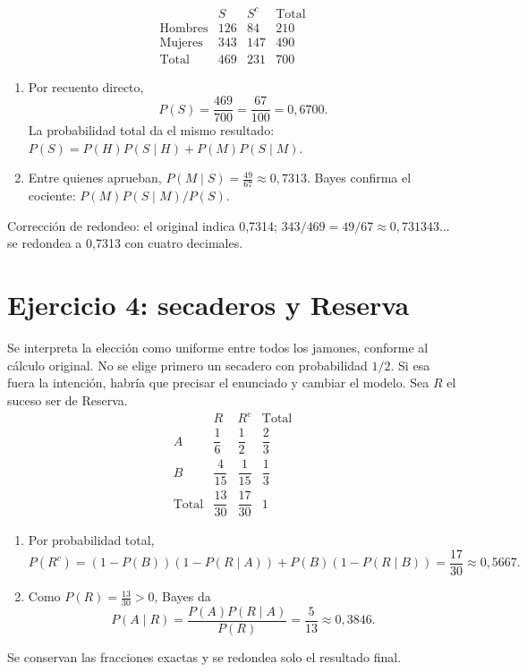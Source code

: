 \documentclass[11pt]{article}
\begin{document}
\[\begin{array}{c|rr|r}&S&S^c&\text{Total}\\\hline\text{Hombres}&126&84&210\\\text{Mujeres}&343&147&490\\\hline\text{Total}&469&231&700\end{array}\]
\begin{enumerate}[label=(\alph*)]\item Por recuento directo,\[P(S)=\frac{469}{700}=\boxed{\frac{67}{100}}=0,6700.\]
La probabilidad total da el mismo resultado: $P(S)=P(H)P(S\mid H)+P(M)P(S\mid M)$.
\item Entre quienes aprueban, $P(M\mid S)=\boxed{\frac{49}{67}}\approx 0,7313$. Bayes confirma el cociente: $P(M)P(S\mid M)/P(S)$.
\end{enumerate}
Corrección de redondeo: el original indica 0,7314; $343/469=49/67\approx 0,731343\ldots$ se redondea a 0,7313 con cuatro decimales.
\clearpage\section*{Ejercicio 4: secaderos y Reserva}
Se interpreta la elección como uniforme entre todos los jamones, conforme al cálculo original. No se elige primero un secadero con probabilidad $1/2$. Si esa fuera la intención, habría que precisar el enunciado y cambiar el modelo. Sea $R$ el suceso ser de Reserva.
\[\begin{array}{c|cc|c}&R&R^c&\text{Total}\\\hline A&\dfrac{1}{6}&\dfrac{1}{2}&\dfrac{2}{3}\\ B&\dfrac{4}{15}&\dfrac{1}{15}&\dfrac{1}{3}\\\hline\text{Total}&\dfrac{13}{30}&\dfrac{17}{30}&1\end{array}\]
\begin{enumerate}[label=(\alph*)]\item Por probabilidad total,\[P(R^c)=(1-P(B))(1-P(R\mid A))+P(B)(1-P(R\mid B))=\boxed{\frac{17}{30}}\approx 0,5667.\]
\item Como $P(R)=\frac{13}{30}>0$, Bayes da\[P(A\mid R)=\frac{P(A)P(R\mid A)}{P(R)}=\boxed{\frac{5}{13}}\approx 0,3846.\]
\end{enumerate}
Se conservan las fracciones exactas y se redondea solo el resultado final.
\end{document}
